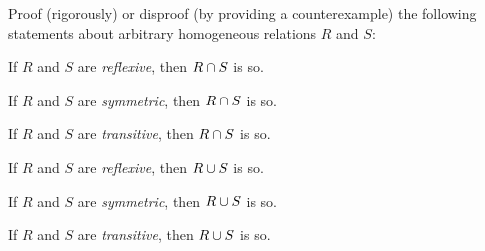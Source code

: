\documentclass[a4paper,12pt]{article}
\begin{document}
\begin{tasks}
\begin{multicols}{2}
\begin{subtasks}




    \end{subtasks}
    \end{multicols}


    \item Proof (rigorously) or disproof (by providing a counterexample) the following statements about arbitrary homogeneous relations $R$ and $S$:

    \begin{multicols}{2}
    \begin{subtasks}
        \item If $R$ and $S$ are \textit{reflexive}, then $R \cap S$ is so.
        \item If $R$ and $S$ are \textit{symmetric}, then $R \cap S$ is so.
        \item If $R$ and $S$ are \textit{transitive}, then $R \cap S$ is so.
        \item If $R$ and $S$ are \textit{reflexive}, then $R \cup S$ is so.
        \item If $R$ and $S$ are \textit{symmetric}, then $R \cup S$ is so.
        \item If $R$ and $S$ are \textit{transitive}, then $R \cup S$ is so.
    \end{subtasks}
    \end{multicols}



\end{tasks}
\end{document}
